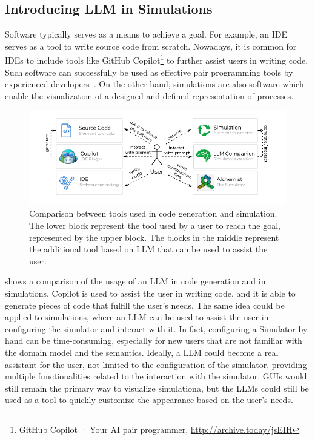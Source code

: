 \documentclass[conference]{IEEEtran}
\begin{document}
\subsection{Introducing \ac{LLM} in Simulations}
Software typically serves as a means to achieve a goal.
%
For example,
an \ac{IDE} serves as a tool to write source code from scratch.
%
Nowadays,
it is common for \acp{IDE} to include tools like GitHub Copilot\footnote{
    GitHub Copilot · Your AI pair programmer, \url{http://archive.today/jsEIH}
} to further assist users in writing code.
%
Such software can successfully be used as effective pair programming tools by experienced developers~\cite{DBLP:journals/jss/DakhelMNKDJ23}.
%
On the other hand,
simulations are also software which enable the visualization of a designed and defined representation of processes.
%
\begin{figure}
    \includegraphics[width=0.954\columnwidth]{use-case}
    \caption{
        Comparison between tools used in code generation and simulation.
        The lower block represent the tool used by a user to reach the goal, represented by the upper block.
        The blocks in the middle represent the additional tool based on \ac{LLM} that can be used to assist the user.
    }
    \label{fig:usecase}
\end{figure}
%
 shows a comparison of the usage of an \ac{LLM} in code generation and in simulations.
%
Copilot is used to assist the user in writing code,
and it is able to generate pieces of code that fulfill the user's needs.
%
The same idea could be applied to simulations,
where an \ac{LLM} can be used to assist the user in configuring the simulator and interact with it.
%
In fact,
configuring a Simulator by hand can be time-consuming,
especially for new users that are not familiar with the domain model and the semantics.
%
Ideally,
a \ac{LLM} could become a real assistant for the user,
not limited to the configuration of the simulator,
providing multiple functionalities related to the interaction with the simulator.
%
\acp{GUI} would still remain the primary way to visualize simulationa,
but the \acp{LLM} could still be used as a tool to quickly customize the appearance based on the user's needs.
\end{document}
